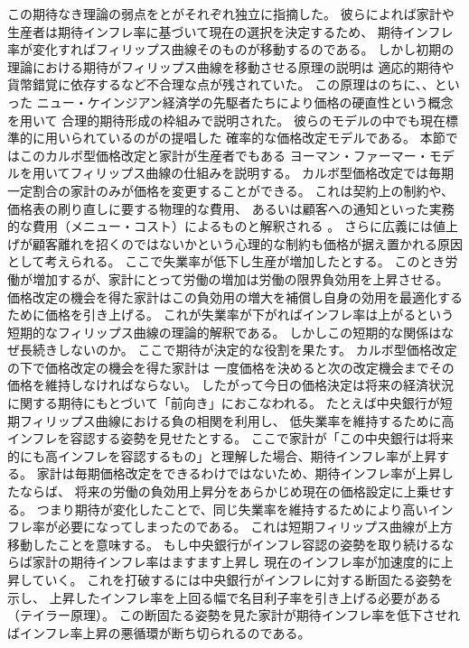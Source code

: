 この期待なき理論の弱点を\textcite{Friedman1968}と\textcite{Phelps1968}がそれぞれ独立に指摘した。
彼らによれば家計や生産者は期待インフレ率に基づいて現在の選択を決定するため、
期待インフレ率が変化すればフィリップス曲線そのものが移動するのである。
しかし初期の理論における期待がフィリップス曲線を移動させる原理の説明は
適応的期待や貨幣錯覚に依存するなど不合理な点が残されていた。
この原理はのちに\textcite{Fischer1977}、\textcite{Taylor1980}、\textcite{Calvo1983}といった
ニュー・ケインジアン経済学の先駆者たちにより価格の硬直性という概念を用いて
合理的期待形成の枠組みで説明された\parencite[この理論的変遷については][を参照]{ClaridaGaliGertler1999}。
彼らのモデルの中でも現在標準的に用いられているのが\textcite{Calvo1983}の提唱した
確率的な価格改定モデルである。
本節ではこのカルボ型価格改定と家計が生産者でもある
ヨーマン・ファーマー・モデルを用いてフィリップス曲線の仕組みを説明する。
カルボ型価格改定では毎期一定割合の家計のみが価格を変更することができる。
これは契約上の制約や、価格表の刷り直しに要する物理的な費用、
あるいは顧客への通知といった実務的な費用（メニュー・コスト）によるものと解釈される
\parencite{ClaridaGaliGertler1999,GoodfriendKing1997}。
さらに広義には値上げが顧客離れを招くのではないかという心理的な制約も価格が据え置かれる原因として考えられる。
ここで失業率が低下し生産が増加したとする。
このとき労働が増加するが、家計にとって労働の増加は労働の限界負効用を上昇させる。
価格改定の機会を得た家計はこの負効用の増大を補償し自身の効用を最適化するために価格を引き上げる。
これが失業率が下がればインフレ率は上がるという短期的なフィリップス曲線の理論的解釈である。
しかしこの短期的な関係はなぜ長続きしないのか。
ここで期待が決定的な役割を果たす。
カルボ型価格改定の下で価格改定の機会を得た家計は
一度価格を決めると次の改定機会までその価格を維持しなければならない。
したがって今日の価格決定は将来の経済状況に関する期待にもとづいて「前向き」におこなわれる。
たとえば中央銀行が短期フィリップス曲線における負の相関を利用し、
低失業率を維持するために高インフレを容認する姿勢を見せたとする。
ここで家計が「この中央銀行は将来的にも高インフレを容認するもの」と理解した場合、期待インフレ率が上昇する。
家計は毎期価格改定をできるわけではないため、期待インフレ率が上昇したならば、
将来の労働の負効用上昇分をあらかじめ現在の価格設定に上乗せする。
つまり期待が変化したことで、同じ失業率を維持するためにより高いインフレ率が必要になってしまったのである。
これは短期フィリップス曲線が上方移動したことを意味する。
もし中央銀行がインフレ容認の姿勢を取り続けるならば家計の期待インフレ率はますます上昇し
現在のインフレ率が加速度的に上昇していく。
これを打破するには中央銀行がインフレに対する断固たる姿勢を示し、
上昇したインフレ率を上回る幅で名目利子率を引き上げる必要がある（テイラー原理）。
この断固たる姿勢を見た家計が期待インフレ率を低下させればインフレ率上昇の悪循環が断ち切られるのである。

